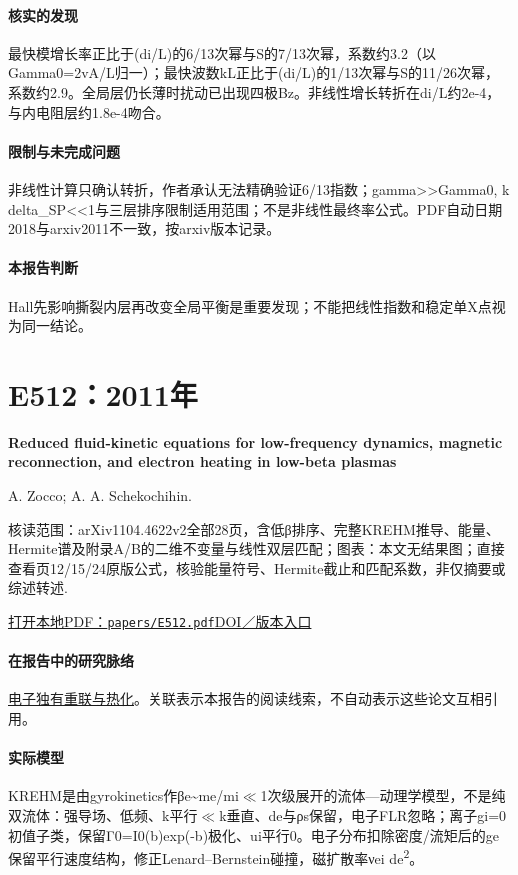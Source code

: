 \documentclass[UTF8,a4paper,11pt,openany,fontset=fandol]{ctexbook}
\begin{document}
\paragraph{核实的发现}最快模增长率正比于(di/L)的6/13次幂与S的7/13次幂，系数约3.2（以Gamma0=2vA/L归一）；最快波数kL正比于(di/L)的1/13次幂与S的11/26次幂，系数约2.9。全局层仍长薄时扰动已出现四极Bz。非线性增长转折在di/L约2e-4，与内电阻层约1.8e-4吻合。

\paragraph{限制与未完成问题}非线性计算只确认转折，作者承认无法精确验证6/13指数；gamma>>Gamma0, k delta\_SP<<1与三层排序限制适用范围；不是非线性最终率公式。PDF自动日期2018与arxiv2011不一致，按arxiv版本记录。

\paragraph{本报告判断}Hall先影响撕裂内层再改变全局平衡是重要发现；不能把线性指数和稳定单X点视为同一结论。

\section{E512：2011年}\label{paper:E512}

\textbf{Reduced fluid-kinetic equations for low-frequency dynamics,  magnetic reconnection,  and electron heating in low-beta plasmas}\citep{E512}\

A. Zocco;  A. A. Schekochihin.

\textsf{核读范围：}arXiv1104.4622v2全部28页，含低β排序、完整KREHM推导、能量、Hermite谱及附录A/B的二维不变量与线性双层匹配；\textsf{图表：}本文无结果图；直接查看页12/15/24原版公式，核验能量符号、Hermite截止和匹配系数，非仅摘要或综述转述.

\href{run:../papers/E512.pdf}{打开本地PDF：\texttt{papers/E512.pdf}}\quad\href{https://doi.org/10.1063/1.3628639}{DOI／版本入口}

\paragraph{在报告中的研究脉络}\hyperref[story:energy]{电子独有重联与热化}。关联表示本报告的阅读线索，不自动表示这些论文互相引用。

\paragraph{实际模型}KREHM是由gyrokinetics作βe\textasciitilde{}me/mi\ensuremath{\ll}1次级展开的流体—动理学模型，不是纯双流体：强导场、低频、k平行\ensuremath{\ll}k垂直、de与ρs保留，电子FLR忽略；离子gi=0初值子类，保留Γ0=I0(b)exp(-b)极化、ui平行0。电子分布扣除密度/流矩后的ge保留平行速度结构，修正Lenard–Bernstein碰撞，磁扩散率νei de\textsuperscript{2}。
\end{document}
